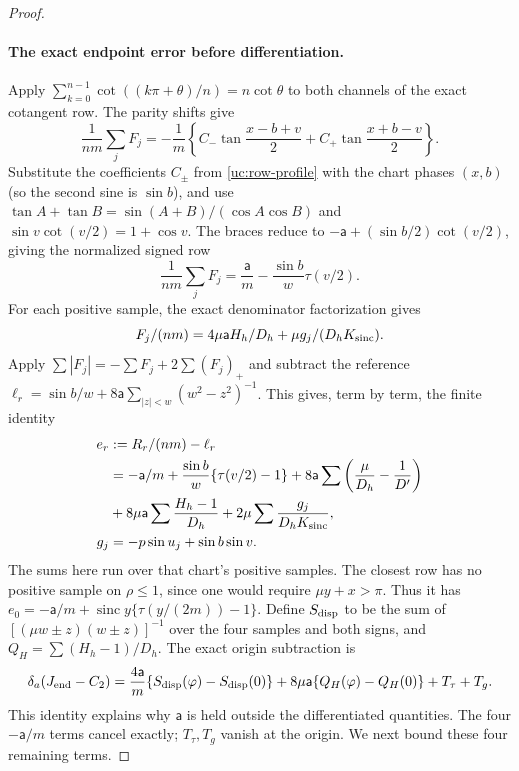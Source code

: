 \begin{proof}
\paragraph{The exact endpoint error before differentiation.}
Apply $\sum_{k=0}^{n-1}\cot((k\pi+\theta)/n)=n\cot\theta$
to both channels of the exact cotangent row. The parity shifts give
\[
 \frac1{nm}\sum_jF_j=-\frac1m\left\{
 C_-\tan\frac{x-b+v}{2}+C_+\tan\frac{x+b-v}{2}\right\}.
\]
Substitute the coefficients $C_\pm$ from \eqref{uc:row-profile}
with the chart phases $(x,b)$ (so the second sine is $\sin b$), and use
$\tan A+\tan B=\sin(A+B)/(\cos A\cos B)$ and
$\sin v\cot(v/2)=1+\cos v$. The braces reduce to
$-\mathsf a+(\sin b/2)\cot(v/2)$, giving the normalized signed row
\[
 \frac1{nm}\sum_jF_j=\frac{\mathsf a}{m}
                       -\frac{\sin b}{w}\tau(v/2).
\]
For each positive sample, the exact denominator factorization gives
\[
 F_j/(nm)=4\mu\mathsf aH_h/D_h+\mu g_j/(D_h K_{\rm sinc}).
\]
Apply $\sum|F_j|=-\sum F_j+2\sum(F_j)_+$ and subtract the
reference $\ell_r=\sin b/w+8\mathsf a\sum_{|z|<w}(w^2-z^2)^{-1}$.
This gives, term by term, the finite identity
\[
 \begin{aligned}
 e_r&:=R_r/(nm)-\ell_r\\
 &=-\mathsf{a}/m+\frac{\sin b}{w}\{\tau(v/2)-1\}
       +8\mathsf{a}\sum\left(\frac\mu{D_h}-\frac1{D'}\right)\\
   &+8\mu \mathsf{a}\sum\frac{H_h-1}{D_h}
       +2\mu\sum\frac{g_j}{D_h K_{\rm sinc}},\\
 g_j&=-p\sin u_j+\sin b\sin v.
 \end{aligned}
\]
The sums here run over that chart's positive samples. The closest row has no positive sample on $\rho\leq1$,
since one would require $\mu y+x>\pi$. Thus it has $e_0=-\mathsf{a}/m+\operatorname{sinc}y\{\tau(y/(2m))-1\}$.
Define $S_{\rm disp}$ to be the sum of
$[(\mu w\pm z)(w\pm z)]^{-1}$ over the four samples and both
signs, and $Q_H=\sum(H_h-1)/D_h$. The exact origin subtraction is
\[
 \delta_a(J_{\rm end}-C_2)
 =\frac{4\mathsf{a}}m\{S_{\rm disp}(\varphi)-S_{\rm disp}(0)\}
       +8\mu \mathsf{a}\{Q_H(\varphi)-Q_H(0)\}+T_\tau+T_g.
\]
This identity explains why $\mathsf{a}$ is held outside the differentiated
quantities. The four $-\mathsf{a}/m$ terms cancel exactly; $T_\tau,T_g$
vanish at the origin. We next bound these four remaining terms.


\end{proof}
